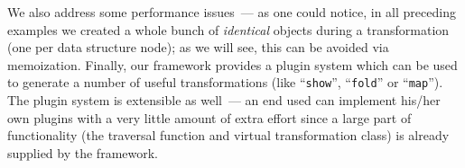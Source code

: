 We also address some performance issues~--- as one could notice, in all preceding examples we created a whole bunch of \emph{identical} objects during a
transformation (one per data structure node); as we will see, this can be avoided via memoization. Finally, our framework provides a plugin system which can be
used to generate a number of useful transformations (like ``\lstinline{show}'', ``\lstinline{fold}'' or ``\lstinline{map}''). The plugin system is
extensible as well~--- an end used can implement his/her own plugins with a very little amount of extra effort since a large part of functionality (the traversal
function and virtual transformation class) is already supplied by the framework. 
